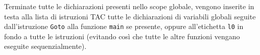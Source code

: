 
Terminate tutte le dichiarazioni presenti nello scope globale, vengono inserite in testa alla lista di istruzioni TAC tutte le dichiarazioni di variabili globali seguite dall'istruzione {\tt Goto} alla funzione {\tt main} se presente, oppure all'etichetta {\tt l0} in fondo a tutte le istruzioni (evitando così che tutte le altre funzioni vengano eseguite sequenzialmente).